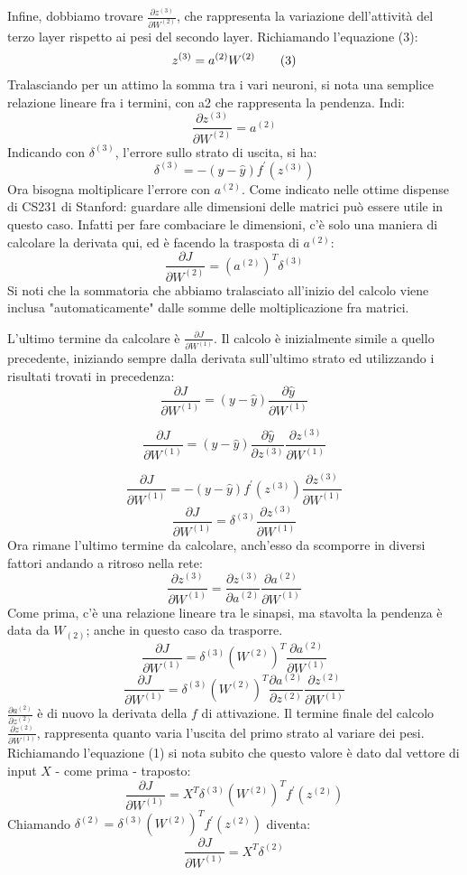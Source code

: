 Infine, dobbiamo trovare $\frac{\partial z^{(3)}}{\partial W^{(2)}}$, che rappresenta la variazione dell'attività del terzo layer rispetto ai pesi del secondo layer. Richiamando l'equazione (3):
$$
z^{(3)} = a^{(2)}W^{(2)} \tag{3}\\
$$
Tralasciando per un attimo la somma tra i vari neuroni, si nota una semplice relazione lineare fra i termini, con a2 che rappresenta la pendenza. Indi:
$$
\frac{\partial z^{(3)}}{\partial W^{(2)}} = a^{(2)}
$$
Indicando con $\delta^{(3)}$, l'errore sullo strato di uscita, si ha:
$$
\delta^{(3)} = -(y-\hat{y}) f^\prime(z^{(3)})
$$
Ora bisogna moltiplicare l'errore con $a^{(2)}$. Come indicato nelle ottime dispense di CS231 di Stanford\parencite{WCS231vec}: guardare alle dimensioni delle matrici può essere utile in questo caso. Infatti per fare combaciare le dimensioni, c'è solo una maniera di calcolare la derivata qui, ed è facendo la trasposta di $a^{(2)}$:
$$
\frac{\partial J}{\partial W^{(2)}} =
(a^{(2)})^T\delta^{(3)}\tag{6}
$$
Si noti che la sommatoria che abbiamo tralasciato all'inizio del calcolo viene inclusa "automaticamente" dalle somme delle moltiplicazione fra matrici.

L'ultimo termine da calcolare è $\frac{\partial J}{\partial W^{(1)}}$.
Il calcolo è inizialmente simile a quello precedente, iniziando sempre dalla derivata sull'ultimo strato ed utilizzando i risultati trovati in precedenza:
$$
\frac{\partial J}{\partial W^{(1)}} = (y-\hat{y})
\frac{\partial \hat{y}}{\partial W^{(1)}}
$$

$$
\frac{\partial J}{\partial W^{(1)}} = (y-\hat{y})
\frac{\partial \hat{y}}{\partial z^{(3)}}
\frac{\partial z^{(3)}}{\partial W^{(1)}}
$$

$$
\frac{\partial J}{\partial W^{(1)}} = -(y-\hat{y}) f^\prime(z^{(3)}) \frac{\partial z^{(3)}}{\partial W^{(1)}}
$$
$$
\frac{\partial J}{\partial W^{(1)}} = \delta^{(3)} \frac{\partial z^{(3)}}{\partial W^{(1)}}
$$
Ora rimane l'ultimo termine da calcolare, anch'esso da scomporre in diversi fattori andando a ritroso nella rete:
$$
\frac{\partial z^{(3)}}{\partial W^{(1)}} = \frac{\partial z^{(3)}}{\partial a^{(2)}}\frac{\partial a^{(2)}}{\partial W^{(1)}}
$$
Come prima, c'è una relazione lineare tra le sinapsi, ma stavolta la pendenza è data da $W_{(2)}$; anche in questo caso da trasporre.
$$
\frac{\partial J}{\partial W^{(1)}} = \delta^{(3)}
(W^{(2)})^{T}
\frac{\partial a^{(2)}}{\partial W^{(1)}}
$$
$$
\frac{\partial J}{\partial W^{(1)}} = \delta^{(3)}
(W^{(2)})^{T}
\frac{\partial a^{(2)}}{\partial z^{(2)}}
\frac{\partial z^{(2)}}{\partial W^{(1)}}
$$
$\frac{\partial a^{(2)}}{\partial z^{(2)}}$ è di nuovo la derivata della $f$ di attivazione. Il termine finale del calcolo $\frac{\partial z^{(2)}}{\partial W^{(1)}}$, rappresenta quanto varia l'uscita del primo strato al variare dei pesi. Richiamando l'equazione (1) si nota subito che questo valore è dato dal vettore di input $X$ - come prima - traposto:
$$
\frac{\partial J}{\partial W^{(1)}} =
X^{T}
\delta^{(3)}
(W^{(2)})^{T}
f^\prime(z^{(2)})
$$
Chiamando $\delta^{(2)} = \delta^{(3)} (W^{(2)})^{T} f^\prime(z^{(2)})$ diventa:
$$
\frac{\partial J}{\partial W^{(1)}} =
X^{T}\delta^{(2)} \tag{7}
$$

